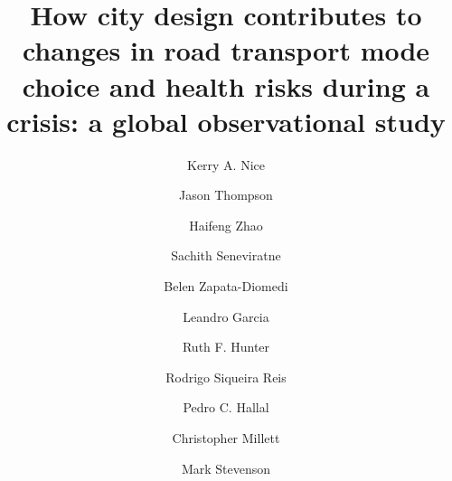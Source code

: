 \documentclass[preprint,10pt]{elsarticle} %
\begin{document}
\begin{frontmatter}

\title{How city design contributes to changes in road transport mode choice and health risks during a crisis: a global observational study}

\author[melb]{Kerry A. Nice}
\author[melb,sun]{Jason Thompson}
\author[melb]{Haifeng Zhao}
\author[melb]{Sachith Seneviratne}
\author[RMII]{Belen Zapata-Diomedi}
\author[Belfast,phy]{Leandro Garcia}
\author[Belfast]{Ruth F. Hunter}
\author[wash]{Rodrigo Siqueira Reis}
\author[uill,PPE]{Pedro C. Hallal}
\author[imp,nova,ieps]{Christopher Millett}
\author[melb,eng]{Mark Stevenson}

\address[melb]{Transport, Health, and Urban Systems Research Lab, Faculty of Architecture, Building, and Planning, University of Melbourne, VIC, Australia}
\address[eng]{Faculty of Engineering and Information Technology and the Melbourne School of Population and Global Health, University of Melbourne, VIC, Australia}
\address[sun]{Centre for Human Factors and Sociotechnical Systems University of the Sunshine Coast, Queensland, Australia}
\address[RMII]{Healthy Liveable Cities Lab, Centre for Urban Research, RMIT University, Melbourne, Australia}
\address[Belfast]{Centre for Public Health, Queen’s University Belfast, Institute of Clinical Sciences B, Belfast, Northern Ireland, UK}
\address[wash]{Washington University, St. Louis, Missouri, US}
\address[uill]{Department of Kinesiology and Community Health, University of Illinois Urbana-Champaign}
\address[imp]{Public Health Policy Evaluation Unit, School of Public Health, Imperial College London, London, United Kingdom}
\address[nova]{NOVA National School of Public Health, Public Health Research Centre, Comprehensive Health Research Center (CHRC), NOVA University Lisbon, Lisbon, Portugal}
\address[ieps]{Instituto de Estudos para Políticas de Saúde (IEPS), São Paulo, Brazil}
\address[PPE]{Postgraduate Program in Epidemiology, Federal University of Pelotas, Brazil}
\address[phy]{Physical Activity Epidemiology Group, University of São Paulo, São Paulo, Brazil}



\end{frontmatter}
\end{document}
